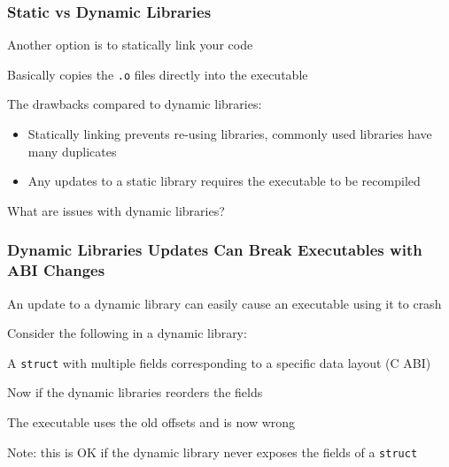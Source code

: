   \begin{frame}
    \frametitle{Static vs Dynamic Libraries}

    Another option is to statically link your code

    \hspace{1em} Basically copies the \texttt{.o} files directly into the
    executable

    \vspace{2em}

    The drawbacks compared to dynamic libraries:
    \begin{itemize}
      \item Statically linking prevents re-using libraries, commonly used
            libraries have many duplicates
      \item Any updates to a static library requires the executable to be
            recompiled
    \end{itemize}

    \vspace{2em}

    What are issues with dynamic libraries?
  \end{frame}

  \begin{frame}
    \frametitle{Dynamic Libraries Updates Can Break Executables with ABI
                Changes}

    An update to a dynamic library can easily cause an executable using it to
    crash

    \vspace{1em}

    Consider the following in a dynamic library:

    \hspace{1em} A \texttt{struct} with multiple fields corresponding to
    a specific data layout (C ABI)

    \vspace{1em}


    \vspace{1em}

    Now if the dynamic libraries reorders the fields

    \hspace{1em} The executable uses the old offsets and is now wrong

    \vspace{1em}

    Note: this is OK if the dynamic library never exposes the fields of a
    \texttt{struct}
  \end{frame}

